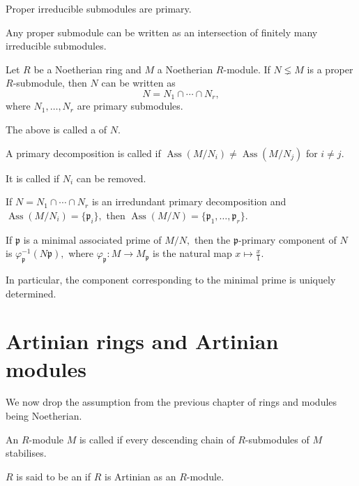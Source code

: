 \documentclass[12pt]{article}	%
\DeclareMathOperator{\Ass}{Ass}
\begin{document}
\begin{thm}
	Proper irreducible submodules are primary.
\end{thm}
\begin{thm}
	Any proper submodule can be written as an intersection of finitely many irreducible submodules.
\end{thm}

\begin{cor}
	Let $R$ be a Noetherian ring and $M$ a Noetherian $R$-module. If $N \lneq M$ is a proper $R$-submodule, then $N$ can be written as
	\begin{equation*} 
		N = N_1 \cap \cdots \cap N_r,
	\end{equation*}
	where $N_1, \ldots, N_r$ are primary submodules. 

	The above is called a  of $N.$
\end{cor}

\begin{defn}
	A primary decomposition is called  if $\Ass(M/N_i) \neq \Ass(M/N_j)$ for $i \neq j.$

	It is called  if $N_i$ can be removed.
\end{defn}

\begin{thm}
	If $N = N_1 \cap \cdots \cap N_r$ is an irredundant primary decomposition and $\Ass(M/N_i) = \{\mathfrak{p}_i\},$ then $\Ass(M/N) = \{\mathfrak{p}_1, \ldots, \mathfrak{p}_r\}.$ 
\end{thm}

\begin{thm}
	If $\mathfrak{p}$ is a minimal associated prime of $M/N,$ then the $\mathfrak{p}$-primary component of $N$ is $\varphi_{\mathfrak{p}}^{-1}(N\mathfrak{p}),$ where $\varphi_{\mathfrak{p}} : M \to M_\mathfrak{p}$ is the natural map $x \mapsto \frac{x}{1}.$

	In particular, the component corresponding to the minimal prime is uniquely determined.
\end{thm}

\section{Artinian rings and Artinian modules}

We now drop the assumption from the previous chapter of rings and modules being Noetherian.

\begin{defn}%
	An $R$-module $M$ is called  if every descending chain of $R$-submodules of $M$ stabilises.

	$R$ is said to be an  if $R$ is Artinian as an $R$-module.
\end{defn}
\end{document}
